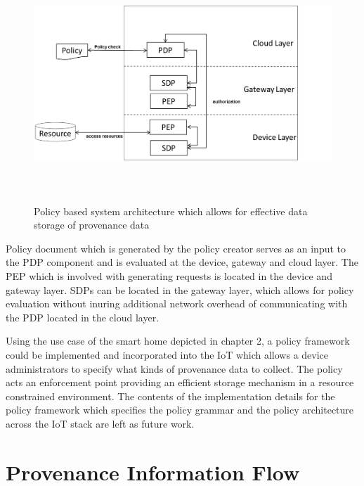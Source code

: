 \begin{figure}[h!]
\begin{center}
\includegraphics[height=3.5in]{policy.png}
\caption{Policy based system architecture which allows for effective data storage of provenance data}
\label{policy_architecture}
\end{center}
\end{figure}


Policy document which is generated by the policy creator serves as an input to the PDP component and is evaluated at the device, gateway and cloud layer. The PEP which is involved with generating requests is located in the device and gateway layer. SDPs can be located in the gateway layer, which allows for policy evaluation without inuring additional network overhead of communicating with the PDP located in the cloud layer. 



\par Using the use case of the smart home depicted in chapter 2, a policy framework could be implemented and incorporated into the IoT which allows a device administrators to specify what kinds of provenance data to collect. The policy acts an enforcement point providing an efficient storage mechanism in a resource constrained environment. The contents of the implementation details for the policy framework which specifies the policy grammar and the policy architecture across the IoT stack are left as future work.


\section{Provenance Information Flow}

